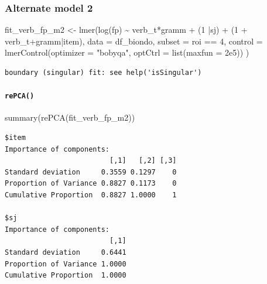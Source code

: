 \documentclass[
  letterpaper,
  DIV=11,
  numbers=noendperiod]{scrartcl}
\let\oldparagraph\paragraph
\renewcommand{\paragraph}[1]{\oldparagraph{#1}\mbox{}}
\newenvironment{Shaded}{\begin{snugshade}}{\end{snugshade}}
\newcommand{\AttributeTok}[1]{\textcolor[rgb]{0.40,0.45,0.13}{#1}}
\newcommand{\DecValTok}[1]{\textcolor[rgb]{0.68,0.00,0.00}{#1}}
\newcommand{\FloatTok}[1]{\textcolor[rgb]{0.68,0.00,0.00}{#1}}
\newcommand{\FunctionTok}[1]{\textcolor[rgb]{0.28,0.35,0.67}{#1}}
\newcommand{\NormalTok}[1]{\textcolor[rgb]{0.00,0.23,0.31}{#1}}
\newcommand{\OtherTok}[1]{\textcolor[rgb]{0.00,0.23,0.31}{#1}}
\newcommand{\SpecialCharTok}[1]{\textcolor[rgb]{0.37,0.37,0.37}{#1}}
\newcommand{\StringTok}[1]{\textcolor[rgb]{0.13,0.47,0.30}{#1}}
\begin{document}
\hypertarget{alternate-model-2}{%
\subsubsection{Alternate model 2}\label{alternate-model-2}}

\begin{Shaded}
\begin{Highlighting}[]
\NormalTok{fit\_verb\_fp\_m2 }\OtherTok{\textless{}{-}} \FunctionTok{lmer}\NormalTok{(}\FunctionTok{log}\NormalTok{(fp) }\SpecialCharTok{\textasciitilde{}}\NormalTok{ verb\_t}\SpecialCharTok{*}\NormalTok{gramm }\SpecialCharTok{+} 
\NormalTok{                      (}\DecValTok{1} \SpecialCharTok{|}\NormalTok{sj) }\SpecialCharTok{+}
\NormalTok{                      (}\DecValTok{1} \SpecialCharTok{+}\NormalTok{ verb\_t}\SpecialCharTok{+}\NormalTok{gramm}\SpecialCharTok{|}\NormalTok{item),}
                    \AttributeTok{data =}\NormalTok{ df\_biondo,}
                    \AttributeTok{subset =}\NormalTok{ roi }\SpecialCharTok{==} \DecValTok{4}\NormalTok{,}
                    \AttributeTok{control =} \FunctionTok{lmerControl}\NormalTok{(}\AttributeTok{optimizer =} \StringTok{"bobyqa"}\NormalTok{,}
                                          \AttributeTok{optCtrl =} \FunctionTok{list}\NormalTok{(}\AttributeTok{maxfun =} \FloatTok{2e5}\NormalTok{))}
\NormalTok{)}
\end{Highlighting}
\end{Shaded}

\begin{verbatim}
boundary (singular) fit: see help('isSingular')
\end{verbatim}

\hypertarget{repca-1}{%
\paragraph{\texorpdfstring{\texttt{rePCA()}}{rePCA()}}\label{repca-1}}

\begin{Shaded}
\begin{Highlighting}[]
\FunctionTok{summary}\NormalTok{(}\FunctionTok{rePCA}\NormalTok{(fit\_verb\_fp\_m2))}
\end{Highlighting}
\end{Shaded}

\begin{verbatim}
$item
Importance of components:
                         [,1]   [,2] [,3]
Standard deviation     0.3559 0.1297    0
Proportion of Variance 0.8827 0.1173    0
Cumulative Proportion  0.8827 1.0000    1

$sj
Importance of components:
                         [,1]
Standard deviation     0.6441
Proportion of Variance 1.0000
Cumulative Proportion  1.0000
\end{verbatim}
\end{document}
